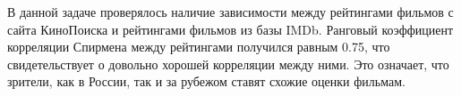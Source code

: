 В данной задаче проверялось наличие зависимости между рейтингами фильмов с сайта КиноПоиска и рейтингами фильмов из базы IMDb. Ранговый коэффициент корреляции Спирмена между рейтингами получился равным 0.75, что свидетельствует о довольно хорошей корреляции между ними. Это означает, что зрители, как в России, так и за рубежом ставят схожие оценки фильмам.



